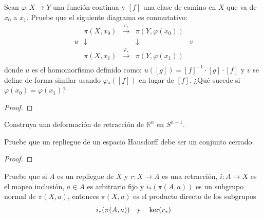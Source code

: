 \documentclass[12pt]{report}
\theoremstyle{largebreak}
\newcommand\cf[3]{\ensuremath{#1:#2\rightarrow#3}}
\begin{document}
    \begin{excer}
        Sean $\cf{\varphi}{X}{Y}$ una función continua y $[f]$ una clase de camino en $X$ que va de $x_0$ a $x_1$. Pruebe que el siguiente diagrama es conmutativo:
        \begin{equation*}
            \begin{array}{rcccl}
              & \pi(X,x_0) & \overset{\varphi_*}{\longrightarrow} & \pi(Y,\varphi(x_0)) & \\
              u & \downarrow & & \downarrow & v \\
               & \pi(X,x_1) & \overset{\varphi_*}{\longrightarrow} & \pi(Y,\varphi(x_1)) & \\
            \end{array}
        \end{equation*}
        donde $u$ es el homomorfismo definido como: $u([g])=[f]^{-1}\cdot[g]\cdot[f]$ y $v$ se define de forma similar usando $\varphi_*([f])$ en lugar de $[f]$. ¿Qué sucede si $\varphi(x_0)=\varphi(x_1)$?
    \end{excer}

    \begin{proof}
        
    \end{proof}

    \begin{excer}
        Construya una deformación de retracción de $\mathbb{R}^n$ en $S^{ n-1}$.
    \end{excer}

    \begin{sol}
        
    \end{sol}

    \begin{excer}
        Pruebe que un repliegue de un espacio Hausdorff debe ser un conjunto cerrado.
    \end{excer}

    \begin{proof}
        
    \end{proof}

    \begin{excer}
        Pruebe que si $A$ es un repliegue de $X$ y $\cf{r}{X}{A}$ es una retracción, $\cf{i}{A}{X}$ es el mapeo inclusión, $a\in A$ es arbitrario fijo y $i_*(\pi(A,a))$ es un subgrupo normal de $\pi(X,a)$, entonces $\pi(X,a)$ es el producto directo de los subgrupos
        \begin{equation*}
            i_*(\pi(A,a))\quad\textup{y}\quad \ker(r_*)
        \end{equation*}
    \end{excer}
\end{document}
